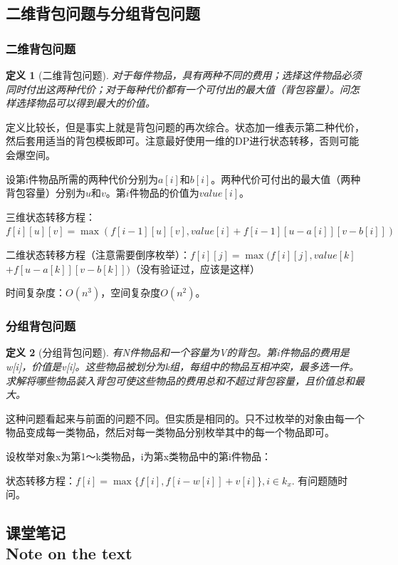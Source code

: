 \documentclass{article}
\newtheorem{definition}{定义}[subsection]
\theoremstyle{nonumberplain}
\newcommand{\note}{\ \par


	\subsection*{课堂笔记\\\tiny{Note on the text}}
	\newpage}
\begin{document}
\subsection{二维背包问题与分组背包问题}
\subsubsection{二维背包问题}
\begin{definition}[二维背包问题]对于每件物品，具有两种不同的费用；选择这件物品必须同时付出这两种代价；对于每种代价都有一个可付出的最大值（背包容量）。问怎样选择物品可以得到最大的价值。\end{definition}

定义比较长，但是事实上就是背包问题的再次综合。状态加一维表示第二种代价，然后套用适当的背包模板即可。注意最好使用一维的DP进行状态转移，否则可能会爆空间。


设第i件物品所需的两种代价分别为$a[i]$和$b[i]$。两种代价可付出的最大值（两种背包容量）分别为$u$和$v$。第$i$件物品的价值为$value[i]$。

三维状态转移方程：$f[i][u][v] = \max(f[i-1][u][v] , value[i] + f[i-1][u-a[i]][v-b[i]])$

二维状态转移方程（注意需要倒序枚举）：$f[i][j] = \max(f[i][j] , value[k]$ $+ f[u-a[k]][v-b[k]])$（没有验证过，应该是这样）

时间复杂度：$O(n^3)$，空间复杂度$O(n^2)$。

\subsubsection{分组背包问题}
\begin{definition}[分组背包问题]有N件物品和一个容量为V的背包。第i件物品的费用是w[i]，价值是v[i]。这些物品被划分为k组，每组中的物品互相冲突，最多选一件。求解将哪些物品装入背包可使这些物品的费用总和不超过背包容量，且价值总和最大。\end{definition}

这种问题看起来与前面的问题不同。但实质是相同的。只不过枚举的对象由每一个物品变成每一类物品，然后对每一类物品分别枚举其中的每一个物品即可。

设枚举对象x为第1～k类物品，i为第x类物品中的第i件物品：

状态转移方程：$f[i]=\max\{f[i],f[i-w[i]]+v[i]\},i\in k_x.$
有问题随时问。
\note
\end{document}
